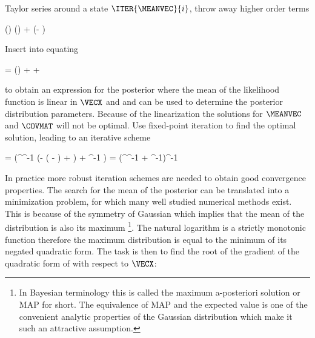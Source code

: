     \startsubsection[title=Iterative Solutions]

        Taylor series around a state $\ITER{\MEANVEC}{i}$, throw away higher
        order terms

        \startformula
            \FWD(\VECX) \approx \FWD()
                +  (\VECX - )
        \stopformula

        Insert into  equating

        \startformula
            \VECB = \FWD() + 
             + \MEANVECERR
        \stopformula

        to obtain an expression for the posterior where the mean of the
        likelihood function is linear in $\VECX$ and  and
         can be used to determine the posterior
        distribution parameters. Because of the linearization the solutions for
        $\MEANVEC$ and $\COVMAT$ will not be optimal. Use fixed-point iteration
        to find the optimal solution, leading to an iterative scheme

        \startsubformulas[eq:gausspostiter]
        \placesubformula
        \startformula
        \startalign[n=3,align={right,left,right}]
            \NC {} = \NC
                 (^\top \COVMATERR^{-1}
                (\VECY - \FWD( - \MEANVECERR)
                +  ) + \COVMATA^{-1} \MEANVECA)
                \EQCOMMA \NC \NR[eq:gausspostmeaniter][a]
            \NC {} = \NC
                (^\top \COVMATERR^{-1} 
                + \COVMATA^{-1})^{-1}
                \EQSTOP \NC \NR[eq:gausspostcoviter][b]
        \stopalign
        \stopformula
        \stopsubformulas

        In practice more robust iteration schemes are needed to obtain good
        convergence properties. The search for the mean of the posterior can be
        translated into a minimization problem, for which many well studied
        numerical methods exist. This is because of the symmetry of Gaussian
        which implies that the mean of the distribution is also its maximum
        \footnote{In Bayesian terminology this is called the maximum
        a-posteriori solution or MAP for short. The equivalence of MAP and
        the expected value is one of the convenient analytic properties of
        the Gaussian distribution which make it such an attractive
        assumption.}. The natural logarithm is a strictly monotonic function
        therefore the maximum distribution is equal to the minimum of its
        negated quadratic form. The task is then to find the root of the
        gradient of the quadratic form of  with
        respect to $\VECX$:


